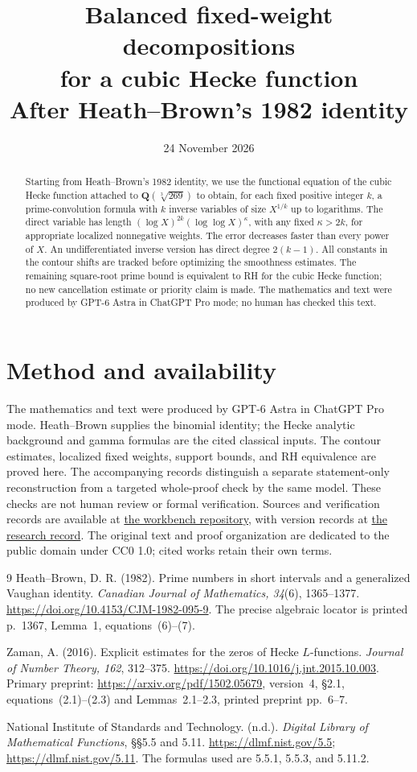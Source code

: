 \documentclass[11pt]{article}
\title{Balanced fixed-weight decompositions\\for a cubic Hecke function\\
\large After Heath--Brown's 1982 identity}
\author{}
\date{24 November 2026}
\numberwithin{equation}{section}
\newcommand{\workbenchurl}{https://github.com/KokunoYumeto/zeta-and-l-functions-workbench}
\newcommand{\recordurl}{https://github.com/KokunoYumeto/mathematics-workbenches}
\begin{document}
\maketitle
\begin{abstract}
Starting from Heath--Brown's 1982 identity, we use the functional
equation of the cubic Hecke function attached to
\(\mathbf Q(\sqrt[3]{269})\) to obtain, for each fixed positive
integer \(k\), a prime-convolution formula with
\(k\) inverse variables of size \(X^{1/k}\) up to logarithms.
The direct variable has length
\((\log X)^{2k}(\log\log X)^\kappa\), with any fixed \(\kappa>2k\),
for appropriate localized nonnegative weights.
The error decreases faster than every power of \(X\).
An undifferentiated inverse version has direct degree \(2(k-1)\).
All constants in the contour shifts are tracked before optimizing
the smoothness estimates.  The remaining square-root prime bound
is equivalent to RH for the cubic Hecke function; no new
cancellation estimate or priority claim is made.
The mathematics and text were produced by GPT-6 Astra in ChatGPT Pro
mode; no human has checked this text.
\end{abstract}

\section*{Method and availability}
The mathematics and text were produced by GPT-6 Astra in ChatGPT Pro mode.
Heath--Brown supplies the binomial identity; the Hecke analytic
background and gamma formulas are the cited classical inputs. The contour
estimates, localized fixed weights, support bounds, and RH equivalence are
proved here. The accompanying records distinguish a separate
statement-only reconstruction from a targeted whole-proof check by the
same model. These checks are not human review or formal verification.
Sources and verification records are available at
\href{\workbenchurl}{the workbench repository}, with version records at
\href{\recordurl}{the research record}.
The original text and proof organization are dedicated to the public
domain under CC0 1.0; cited works retain their own terms.

\begin{thebibliography}{9}
Heath--Brown, D. R. (1982).
Prime numbers in short intervals and a generalized Vaughan identity.
\emph{Canadian Journal of Mathematics, 34}(6), 1365--1377.
\url{https://doi.org/10.4153/CJM-1982-095-9}.
The precise algebraic locator is printed p.~1367, Lemma~1,
equations~(6)--(7).

Zaman, A. (2016).
Explicit estimates for the zeros of Hecke \(L\)-functions.
\emph{Journal of Number Theory, 162}, 312--375.
\url{https://doi.org/10.1016/j.jnt.2015.10.003}.
Primary preprint: \url{https://arxiv.org/pdf/1502.05679},
version~4, \S2.1, equations~(2.1)--(2.3) and
Lemmas~2.1--2.3, printed preprint pp.~6--7.

National Institute of Standards and Technology. (n.d.).
\emph{Digital Library of Mathematical Functions},
\S\S5.5 and 5.11.
\url{https://dlmf.nist.gov/5.5};
\url{https://dlmf.nist.gov/5.11}.
The formulas used are 5.5.1, 5.5.3, and 5.11.2.
\end{thebibliography}
\end{document}
